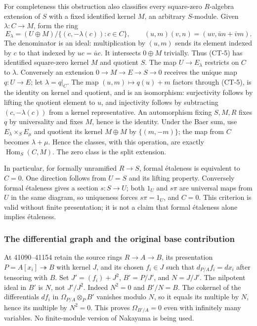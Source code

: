 For completeness this obstruction also classifies every square-zero \(R\)-algebra extension of \(S\) with a fixed identified kernel \(M\), an arbitrary \(S\)-module. Given \(\lambda:C\to M\), form the ring \[
E_\lambda=(U\oplus M)/
\{(c,-\lambda(c)):c\in C\},\qquad
(u,m)(v,n)=(uv,\bar u n+\bar v m).
\tag{CT-5}
\] The denominator is an ideal: multiplication by \((u,m)\) sends its element indexed by \(c\) to that indexed by \(uc=\bar u c\). It intersects \(0\oplus M\) trivially. Thus (CT-5) has identified square-zero kernel \(M\) and quotient \(S\). The map \(U\to E_\lambda\) restricts on \(C\) to \(\lambda\). Conversely an extension \(0\to M\to E\to S\to0\) receives the unique map \(q:U\to E\); let \(\lambda=q|_C\). The map \((u,m)\mapsto q(u)+m\) factors through (CT-5), is the identity on kernel and quotient, and is an isomorphism: surjectivity follows by lifting the quotient element to \(u\), and injectivity follows by subtracting \((c,-\lambda(c))\) from a kernel representative. An automorphism fixing \(S,M,R\) fixes \(q\) by universality and fixes \(M\), hence is the identity. Under the Baer sum, use \(E_\lambda\times_SE_\mu\) and quotient its kernel \(M\oplus M\) by \(\{(m,-m)\}\); the map from \(C\) becomes \(\lambda+\mu\). Hence the classes, with this operation, are exactly \(\operatorname{Hom}_S(C,M)\). The zero class is the split extension.

In particular, for formally unramified \(R\to S\), formal étaleness is equivalent to \(C=0\). One direction follows from \(U=S\) and its lifting property. Conversely formal étaleness gives a section \(s:S\to U\); both \(1_U\) and \(s\pi\) are universal maps from \(U\) in the same diagram, so uniqueness forces \(s\pi=1_U\), and \(C=0\). This criterion is valid without finite presentation; it is not a claim that formal étaleness alone implies étaleness.

\subsubsection{The differential graph and the original base contribution}\label{the-differential-graph-and-the-original-base-contribution}

At 41090--41154 retain the source rings \(R\to A\to B\), its presentation \(P=A[x_i]\twoheadrightarrow B\) with kernel \(J\), and its chosen \(f_i\in J\) such that \(d_{P/A}f_i=dx_i\) after tensoring with \(B\). Set \(J'=(f_i)+J^2\), \(B'=P/J'\), and \(N=J/J'\). The nilpotent ideal in \(B'\) is \(N\), not \(J'/J^2\). Indeed \(N^2=0\) and \(B'/N=B\). The cokernel of the differentials \(df_i\) in \(\Omega_{P/A}\otimes_PB'\) vanishes modulo \(N\), so it equals its multiple by \(N\), hence its multiple by \(N^2=0\). This proves \(\Omega_{B'/A}=0\) even with infinitely many variables. No finite-module version of Nakayama is being used.

